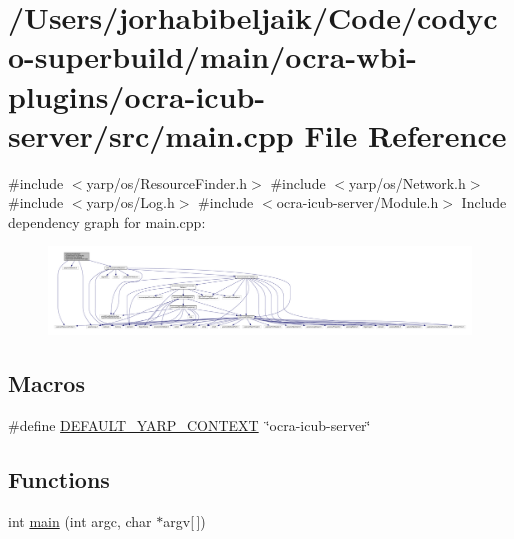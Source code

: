\hypertarget{ocra-icub-server_2src_2main_8cpp}{}\section{/\+Users/jorhabibeljaik/\+Code/codyco-\/superbuild/main/ocra-\/wbi-\/plugins/ocra-\/icub-\/server/src/main.cpp File Reference}
\label{ocra-icub-server_2src_2main_8cpp}
{\ttfamily \#include $<$yarp/os/\+Resource\+Finder.\+h$>$}\newline
{\ttfamily \#include $<$yarp/os/\+Network.\+h$>$}\newline
{\ttfamily \#include $<$yarp/os/\+Log.\+h$>$}\newline
{\ttfamily \#include $<$ocra-\/icub-\/server/\+Module.\+h$>$}\newline
Include dependency graph for main.\+cpp\+:\nopagebreak
\begin{figure}[H]
\begin{center}
\leavevmode
\includegraphics[width=350pt]{ocra-icub-server_2src_2main_8cpp__incl}
\end{center}
\end{figure}
\subsection*{Macros}
\begin{DoxyCompactItemize}
\item 
\#define \hyperlink{ocra-icub-server_2src_2main_8cpp_aacf7b13861a4ce37b8dec1979eb6450c}{D\+E\+F\+A\+U\+L\+T\+\_\+\+Y\+A\+R\+P\+\_\+\+C\+O\+N\+T\+E\+XT}~\char`\"{}ocra-\/icub-\/server\char`\"{}
\end{DoxyCompactItemize}
\subsection*{Functions}
\begin{DoxyCompactItemize}
\item 
int \hyperlink{ocra-icub-server_2src_2main_8cpp_a0ddf1224851353fc92bfbff6f499fa97}{main} (int argc, char $\ast$argv\mbox{[}$\,$\mbox{]})
\end{DoxyCompactItemize}


